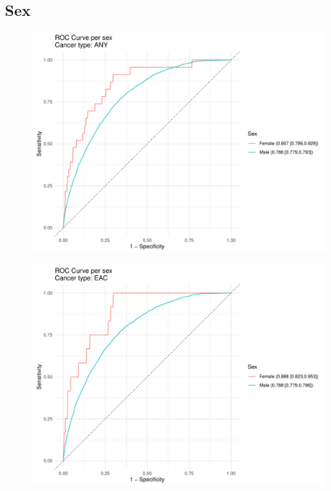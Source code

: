 \documentclass[english]{article}
\begin{document}
\newpage
\clearpage
\subsection{Sex}

\begin{figure}[ht]
\includegraphics[width=1.0\linewidth]{identity/ANY_sex.pdf}
\end{figure}
\begin{figure}[ht]
\includegraphics[width=1.0\linewidth]{identity/EAC_sex.pdf}
\end{figure}
\end{document}
